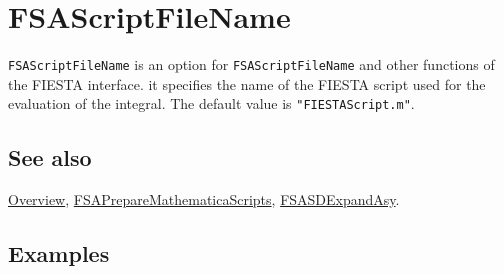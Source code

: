 \documentclass[../FeynHelpersManual.tex]{subfiles}
\begin{document}
\hypertarget{fsascriptfilename}{
\section{FSAScriptFileName}\label{fsascriptfilename}}

\texttt{FSAScriptFileName} is an option for \texttt{FSAScriptFileName}
and other functions of the FIESTA interface. it specifies the name of
the FIESTA script used for the evaluation of the integral. The default
value is \texttt{"FIESTAScript.m"}.

\subsection{See also}

\hyperlink{toc}{Overview},
\hyperlink{fsapreparemathematicascripts}{FSAPrepareMathematicaScripts},
\hyperlink{fsasdexpandasy}{FSASDExpandAsy}.

\subsection{Examples}
\end{document}
